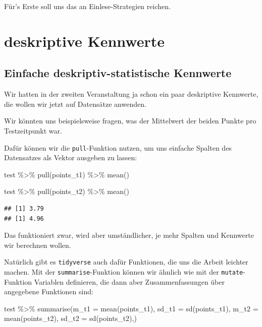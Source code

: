 \documentclass[
]{book}
\newenvironment{Shaded}{\begin{snugshade}}{\end{snugshade}}
\newcommand{\AttributeTok}[1]{\textcolor[rgb]{0.77,0.63,0.00}{#1}}
\newcommand{\FunctionTok}[1]{\textcolor[rgb]{0.00,0.00,0.00}{#1}}
\newcommand{\NormalTok}[1]{#1}
\newcommand{\SpecialCharTok}[1]{\textcolor[rgb]{0.00,0.00,0.00}{#1}}
\begin{document}
Für's Erste soll uns das an Einlese-Strategien reichen.

\hypertarget{deskriptive-kennwerte}{%
\section{deskriptive Kennwerte}\label{deskriptive-kennwerte}}

\hypertarget{einfache-deskriptiv-statistische-kennwerte-2}{%
\subsection{Einfache deskriptiv-statistische Kennwerte}\label{einfache-deskriptiv-statistische-kennwerte-2}}

Wir hatten in der zweiten Veranstaltung ja schon ein paar deskriptive Kennwerte, die wollen wir jetzt auf Datensätze anwenden.

Wir könnten uns beispielsweise fragen, was der Mittelwert der beiden Punkte pro Testzeitpunkt war.

Dafür können wir die \texttt{pull}-Funktion nutzen, um uns einfache Spalten des Datensatzes als Vektor ausgeben zu lassen:

\begin{Shaded}
\begin{Highlighting}[]
\NormalTok{test }\SpecialCharTok{\%\textgreater{}\%} 
  \FunctionTok{pull}\NormalTok{(points\_t1) }\SpecialCharTok{\%\textgreater{}\%} 
  \FunctionTok{mean}\NormalTok{()}

\NormalTok{test }\SpecialCharTok{\%\textgreater{}\%} 
  \FunctionTok{pull}\NormalTok{(points\_t2) }\SpecialCharTok{\%\textgreater{}\%} 
  \FunctionTok{mean}\NormalTok{()}
\end{Highlighting}
\end{Shaded}

\begin{verbatim}
## [1] 3.79
## [1] 4.96
\end{verbatim}

Das funktioniert zwar, wird aber umständlicher, je mehr Spalten und Kennwerte wir berechnen wollen.

Natürlich gibt es \texttt{tidyverse} auch dafür Funktionen, die uns die Arbeit leichter machen. Mit der \texttt{summarise}-Funktion können wir ähnlich wie mit der \texttt{mutate}-Funktion Variablen definieren, die dann aber Zusammenfassungen über angegebene Funktionen sind:

\begin{Shaded}
\begin{Highlighting}[]
\NormalTok{test }\SpecialCharTok{\%\textgreater{}\%}
  \FunctionTok{summarise}\NormalTok{(}\AttributeTok{m\_t1 =} \FunctionTok{mean}\NormalTok{(points\_t1),}
            \AttributeTok{sd\_t1 =} \FunctionTok{sd}\NormalTok{(points\_t1),}
            \AttributeTok{m\_t2 =} \FunctionTok{mean}\NormalTok{(points\_t2),}
            \AttributeTok{sd\_t2 =} \FunctionTok{sd}\NormalTok{(points\_t2),)}
\end{Highlighting}
\end{Shaded}
\end{document}
